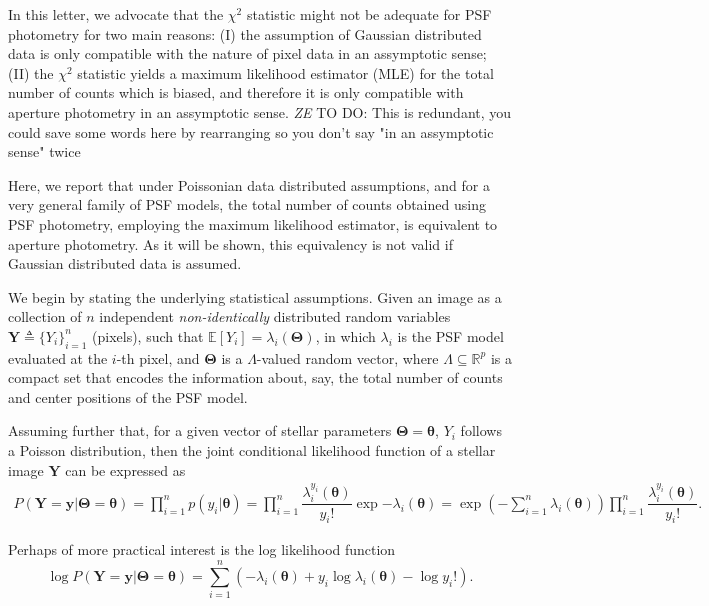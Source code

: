 \documentclass{rnaastex}
\newcommand{\todo}[3]{{\color{#2} \emph{#1} TO DO: #3}}
\newcommand{\zetodo}[1]{\todo{ZE}{cyan}{#1}}
\begin{document}
In this letter, we advocate that the $\chi^2$ statistic might not be adequate
for PSF photometry for two main reasons: (I) the assumption of Gaussian
distributed data is only compatible with the nature of pixel data in an
assymptotic sense; (II) the $\chi^2$ statistic yields a maximum likelihood
estimator (MLE) for the total number of counts which is biased, and therefore
it is only compatible with aperture photometry in an assymptotic sense.
\zetodo{This is redundant, you could save some words here by rearranging
so you don't say "in an assymptotic sense" twice}

Here, we report that under Poissonian data distributed assumptions,
and for a very general family of PSF models, the total number of counts
obtained using PSF photometry, employing the maximum likelihood estimator, is
equivalent to aperture photometry. As it will be shown, this equivalency is not
valid if Gaussian distributed data is assumed.

We begin by stating the underlying statistical assumptions.
Given an image as a collection of $n$ independent \emph{non-identically}
distributed random variables $\bm{Y} \triangleq \{Y_i\}_{i=1}^{n}$ (pixels),
such that $\mathbb{E}\left[Y_i\right] = \lambda_i(\bm{\Theta})$, in which
$\lambda_i$ is the PSF model evaluated at the $i$-th pixel, and $\bm{\Theta}$
is a $\Lambda$-valued random vector, where $\Lambda \subseteq \mathbb{R}^p$ is
a compact set that encodes the information about, say, the total number of
counts and center positions of the PSF model.

Assuming further that, for a given vector of stellar parameters
$\bm{\Theta} = \bm{\theta}$, $Y_i$ follows a Poisson distribution, then the
joint conditional likelihood function of a stellar image $\bm{Y}$ can be
expressed as~\citep{grimmett:2001}
\begin{align}
    P(\bm{Y} = \bm{y} | \bm{\Theta} = \bm{\theta}) =
    \prod_{i=1}^{n} p(y_i | \bm{\theta}) =
    \prod_{i=1}^{n}\dfrac{\lambda_i^{y_i}(\bm{\theta})}{y_i!}\exp{-\lambda_i(\bm{\theta})} =
    \exp\left({-\sum_{i=1}^{n}\lambda_i(\bm{\theta})}\right)\prod_{i=1}^{n}\dfrac{\lambda_i^{y_i}(\bm{\theta})}{y_i!}.
\end{align}

Perhaps of more practical interest is the log likelihood function
\begin{equation}
    \log P(\bm{Y} = \bm{y} | \bm{\Theta} = \bm{\theta}) =
    \sum_{i=1}^{n}\left(- \lambda_i(\bm{\theta})
    + y_i\log\lambda_i(\bm{\theta}) - \log y_i !\right).
\end{equation}
\end{document}
